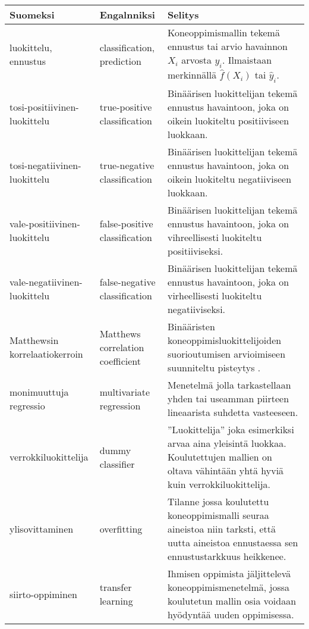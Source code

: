 \documentclass[finnish,twoside,openright]{HYgraduMLDS}
\begin{document}
\begin{center}
    \begin{tabular}{|| m{4cm} | m{3cm} | m{8cm} ||} 
        \hline
        Suomeksi                        & Engalnniksi           &   Selitys \\ [0.5ex] 
        \hline\hline
        luokittelu, ennustus            & classification, prediction        & Koneoppimismallin tekemä ennustus tai arvio havainnon $X_i$ arvosta $y_i$. Ilmaistaan merkinnällä $\hat{f}(X_i)$ tai $\hat{y}_i$. \\
        \hline
        tosi-positiivinen-luokittelu    & true-positive classification      & Binäärisen luokittelijan tekemä ennustus havaintoon, joka on oikein luokiteltu positiiviseen luokkaan. \\
        \hline
        tosi-negatiivinen-luokittelu    & true-negative classification      & Binäärisen luokittelijan tekemä ennustus havaintoon, joka on oikein luokiteltu negatiiviseen luokkaan. \\
        \hline
        vale-positiivinen-luokittelu    & false-positive classification     & Binäärisen luokittelijan tekemä ennustus havaintoon, joka on vihreellisesti luokiteltu positiiviseksi. \\
        \hline
        vale-negatiivinen-luokittelu    & false-negative classification     & Binäärisen luokittelijan tekemä ennustus havaintoon, joka on virheellisesti luokiteltu negatiiviseksi. \\
        \hline
        Matthewsin korrelaatiokerroin   & Matthews correlation coefficient  & Binääristen koneoppimisluokittelijoiden suorioutumisen arvioimiseen suunniteltu pisteytys \cite{MATTHEWS1975442}. \\
        \hline
        monimuuttuja regressio          & multivariate regression           & Menetelmä jolla tarkastellaan yhden tai useamman piirteen lineaarista suhdetta vasteeseen. \\
        \hline
        verrokkiluokittelija            & dummy classifier                  & ''Luokittelija'' joka esimerkiksi arvaa aina yleisintä luokkaa. Koulutettujen mallien on oltava vähintään yhtä hyviä kuin verrokkiluokittelija. \\
        \hline
        ylisovittaminen                 & overfitting                       & Tilanne jossa koulutettu koneoppimismalli seuraa aineistoa niin tarksti, että uutta aineistoa ennustaessa sen ennustustarkkuus heikkenee. \\
        \hline
        siirto-oppiminen                 & transfer learning                       & Ihmisen oppimista jäljittelevä koneoppimismenetelmä, jossa koulutetun mallin osia voidaan hyödyntää uuden oppimisessa. \\
        \hline
    \end{tabular}
\end{center}
\end{document}
